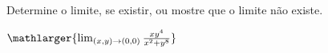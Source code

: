 Determine o limite, se existir, ou mostre que o limite não existe.

\item$\mathlarger{\lim_{(x,y)\rightarrow(0,0)} \frac{xy^4}{x^2+y^8}}$
